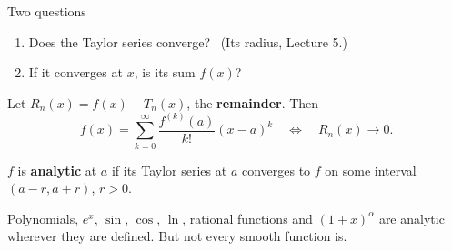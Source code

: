 \documentclass{wosm-slides}
\begin{document}
\begin{frame}{Two questions}
  \begin{enumerate}
    \item Does the Taylor series converge? \ (Its radius, Lecture 5.)
    \item If it converges at $x$, is its sum $f(x)$?
  \end{enumerate}
  \pause
  Let $R_n(x) = f(x) - T_n(x)$, the \textbf{remainder}. Then
  \[ f(x) = \sum_{k=0}^\infty \frac{f^{(k)}(a)}{k!} (x - a)^k
     \quad\iff\quad R_n(x) \to 0 . \]
  \pause
  \begin{definition}
    $f$ is \textbf{analytic} at $a$ if its Taylor series at $a$ converges to $f$ on some
    interval $(a - r, a + r)$, $r > 0$.
  \end{definition}
  Polynomials, $e^x$, $\sin$, $\cos$, $\ln$, rational functions and $(1+x)^\alpha$ are analytic
  wherever they are defined. But not every smooth function is.
\end{frame}
\end{document}
